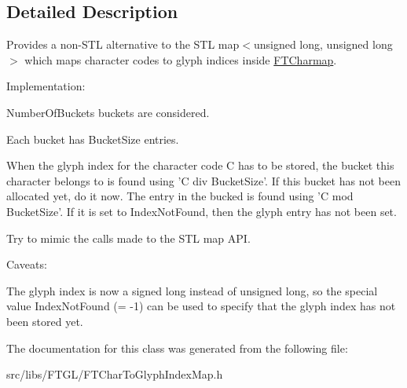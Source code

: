 \subsection{Detailed Description}
Provides a non-\/STL alternative to the STL map$<$unsigned long, unsigned long$>$ which maps character codes to glyph indices inside \hyperlink{class_f_t_charmap}{FTCharmap}.

Implementation:
\begin{DoxyItemize}
\item NumberOfBuckets buckets are considered.
\item Each bucket has BucketSize entries.
\item When the glyph index for the character code C has to be stored, the bucket this character belongs to is found using 'C div BucketSize'. If this bucket has not been allocated yet, do it now. The entry in the bucked is found using 'C mod BucketSize'. If it is set to IndexNotFound, then the glyph entry has not been set.
\item Try to mimic the calls made to the STL map API.
\end{DoxyItemize}

Caveats:
\begin{DoxyItemize}
\item The glyph index is now a signed long instead of unsigned long, so the special value IndexNotFound (= -\/1) can be used to specify that the glyph index has not been stored yet. 
\end{DoxyItemize}

The documentation for this class was generated from the following file:\begin{DoxyCompactItemize}
\item 
src/libs/FTGL/FTCharToGlyphIndexMap.h\end{DoxyCompactItemize}

